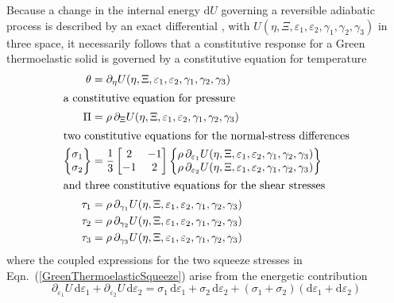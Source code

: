 Because a change in the internal energy $\mathrm{d} U$ governing a reversible adiabatic process is described by an exact differential \cite{Caratheodory09}, with $U( \eta, \Xi, \varepsilon_1 , \varepsilon_2 , \gamma_1 , \gamma_2 , \gamma_3 )$ in three space, it necessarily follows that a constitutive response for a Green thermo\-elastic solid is governed by a constitutive equation for temperature \cite{Freed17}
\begin{subequations}
    \label{GreenThermoelasticSolid}
\begin{align}
\theta & = \partial_{\eta} U( \eta, \Xi, \varepsilon_1 , \varepsilon_2 , \gamma_1 , \gamma_2 , \gamma_3 ) \\
\intertext{a constitutive equation for pressure}
\Pi & = \rho \, \partial_{\Xi} U( \eta, \Xi, \varepsilon_1 , \varepsilon_2 , \gamma_1 , \gamma_2 , \gamma_3 )  \\
\intertext{two constitutive equations for the normal-stress differences}
\left\{ \begin{matrix}
\sigma_1 \\ \sigma_2
\end{matrix} \right\} & = \frac{1}{3} \begin{bmatrix}
2 & -1 \\ -1 & 2
\end{bmatrix} \left\{ \begin{matrix}
\rho \, \partial_{\varepsilon_1} U( \eta, \Xi, \varepsilon_1 , \varepsilon_2 , \gamma_1 , \gamma_2 , \gamma_3 ) \\
\rho \, \partial_{\varepsilon_2} U( \eta, \Xi, \varepsilon_1 , \varepsilon_2 , \gamma_1 , \gamma_2 , \gamma_3 )
\end{matrix} \right\} \label{GreenThermoelasticSqueeze} \\
\intertext{and three constitutive equations for the shear stresses}
\tau_1 & = \rho \, \partial_{\gamma_1} U( \eta, \Xi, \varepsilon_1 , \varepsilon_2 , \gamma_1 , \gamma_2 , \gamma_3 ) \\
\tau_2 & = \rho \, \partial_{\gamma_2} U( \eta, \Xi, \varepsilon_1 , \varepsilon_2 , \gamma_1 , \gamma_2 , \gamma_3 ) \\
\tau_3 & = \rho \, \partial_{\gamma_3} U( \eta, \Xi, \varepsilon_1 , \varepsilon_2 , \gamma_1 , \gamma_2 , \gamma_3 ) 
\end{align}
\end{subequations}
where the coupled expressions for the two squeeze stresses in Eqn.~(\ref{GreenThermoelasticSqueeze}) arise from the energetic contribution
\begin{displaymath}
    \partial_{\varepsilon_1} U \, \mathrm{d} \varepsilon_1 +
    \partial_{\varepsilon_2} U \, \mathrm{d} \varepsilon_2 = 
    \sigma_1 \, \mathrm{d} \varepsilon_1 +
    \sigma_2 \, \mathrm{d} \varepsilon_2 + 
    (\sigma_1 + \sigma_2) (\mathrm{d} \varepsilon_1 + \mathrm{d} \varepsilon_2)
\end{displaymath}
